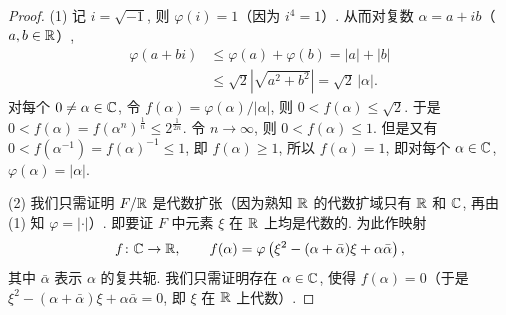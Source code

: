 \begin{proof}
(1) 记 $i=\sqrt{-1}$, 则 $\varphi(i)=1$（因为 $i^4=1$）. 从而对复数 $\alpha=a+ib$（$a,b\in\mathbb{R}$）,
\begin{align*}
  \varphi(a+bi)&\leqslant\varphi(a)+\varphi(b)=|a|+|b|\\
  &\leqslant\sqrt{2}\left|\sqrt{a^2+b^2}\right|=\sqrt{2}\,|\alpha|.
\end{align*}
对每个 $0\neq\alpha\in\mathbb{C}$, 令 $f(\alpha)=\varphi(\alpha)/|\alpha|$, 则 $0<f(\alpha)\leqslant\sqrt{2}$. 于是 $0<f(\alpha)=f(\alpha^n)^{\frac{1}{n}}\leqslant 2^{\frac{1}{2n}}$. 令 $n\to\infty$, 则 $0<f(\alpha)\leqslant 1$. 但是又有 $0<f(\alpha^{-1})=f(\alpha)^{-1}\leqslant 1$, 即 $f(\alpha)\geqslant 1$, 所以 $f(\alpha)=1$, 即对每个 $\alpha\in\mathbb{C}$, $\varphi(\alpha)=|\alpha|$.

(2) 我们只需证明 $F/\mathbb{R}$ 是代数扩张（因为熟知 $\mathbb{R}$ 的代数扩域只有 $\mathbb{R}$ 和 $\mathbb{C}$, 再由 (1) 知 $\varphi=|\cdot|$）. 即要证 $F$ 中元素 $\xi$ 在 $\mathbb{R}$ 上均是代数的. 为此作映射
\[
  f\colon\mathbb{C}\to\mathbb{R},\qquad f(\alpha)=\varphi\left(\xi^2-(\alpha+\bar{\alpha})\xi+\alpha\bar{\alpha}\right),
\]
其中 $\bar{\alpha}$ 表示 $\alpha$ 的复共轭. 我们只需证明存在 $\alpha\in\mathbb{C}$, 使得 $f(\alpha)=0$（于是 $\xi^2-(\alpha+\bar{\alpha})\xi+\alpha\bar{\alpha}=0$, 即 $\xi$ 在 $\mathbb{R}$ 上代数）.


\end{proof}
